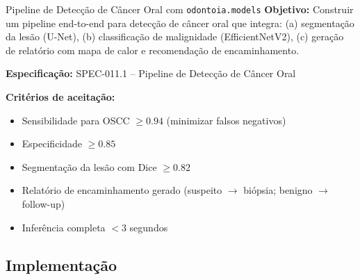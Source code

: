 \begin{pratica}{Pipeline de Detecção de Câncer Oral com \texttt{odontoia.models}}
  \textbf{Objetivo:} Construir um pipeline end-to-end para detecção de câncer
  oral que integra: (a) segmentação da lesão (U-Net), (b) classificação de
  malignidade (EfficientNetV2), (c) geração de relatório com mapa de calor e
  recomendação de encaminhamento.

  \textbf{Especificação:} SPEC-011.1 -- Pipeline de Detecção de Câncer Oral

  \textbf{Critérios de aceitação:}
  \begin{itemize}
    \item Sensibilidade para OSCC $\geq 0.94$ (minimizar falsos negativos)
    \item Especificidade $\geq 0.85$
    \item Segmentação da lesão com Dice $\geq 0.82$
    \item Relatório de encaminhamento gerado (suspeito $\to$ biópsia; benigno $\to$ follow-up)
    \item Inferência completa $< 3$ segundos
  \end{itemize}
\end{pratica}

\subsection{Implementação}

